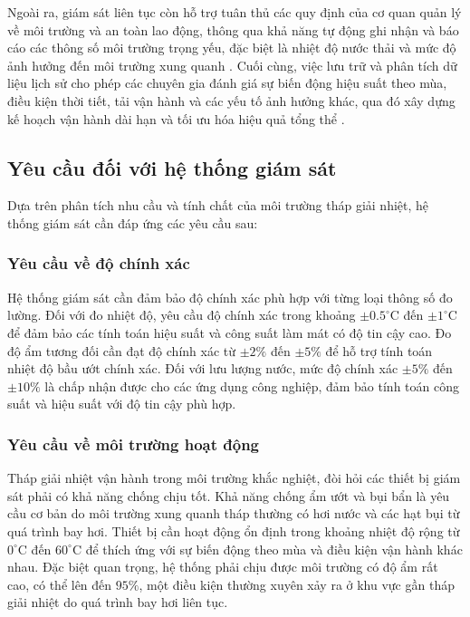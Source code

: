 \documentclass[../main.tex]{subfiles}
\begin{document}
Ngoài ra, giám sát liên tục còn hỗ trợ tuân thủ các quy định của cơ quan quản lý về môi trường và an toàn lao động, thông qua khả năng tự động ghi nhận và báo cáo các thông số môi trường trọng yếu, đặc biệt là nhiệt độ nước thải và mức độ ảnh hưởng đến môi trường xung quanh \cite{epa_cooling_tower_guide_2017}. Cuối cùng, việc lưu trữ và phân tích dữ liệu lịch sử cho phép các chuyên gia đánh giá sự biến động hiệu suất theo mùa, điều kiện thời tiết, tải vận hành và các yếu tố ảnh hưởng khác, qua đó xây dựng kế hoạch vận hành dài hạn và tối ưu hóa hiệu quả tổng thể \cite{li2023ai,pham2023adaptive}.

\subsection{Yêu cầu đối với hệ thống giám sát}
\label{sec:monitoring_system_requirements}

Dựa trên phân tích nhu cầu và tính chất của môi trường tháp giải nhiệt, hệ thống giám sát cần đáp ứng các yêu cầu sau:

\subsubsection{Yêu cầu về độ chính xác}
Hệ thống giám sát cần đảm bảo độ chính xác phù hợp với từng loại thông số đo lường. Đối với đo nhiệt độ, yêu cầu độ chính xác trong khoảng $\pm 0.5^\circ\mathrm{C}$ đến $\pm 1^\circ\mathrm{C}$ để đảm bảo các tính toán hiệu suất và công suất làm mát có độ tin cậy cao. Đo độ ẩm tương đối cần đạt độ chính xác từ $\pm 2\%$ đến $\pm 5\%$ để hỗ trợ tính toán nhiệt độ bầu ướt chính xác. Đối với lưu lượng nước, mức độ chính xác $\pm 5\%$ đến $\pm 10\%$ là chấp nhận được cho các ứng dụng công nghiệp, đảm bảo tính toán công suất và hiệu suất với độ tin cậy phù hợp.

\subsubsection{Yêu cầu về môi trường hoạt động}
Tháp giải nhiệt vận hành trong môi trường khắc nghiệt, đòi hỏi các thiết bị giám sát phải có khả năng chống chịu tốt. Khả năng chống ẩm ướt và bụi bẩn là yêu cầu cơ bản do môi trường xung quanh tháp thường có hơi nước và các hạt bụi từ quá trình bay hơi. Thiết bị cần hoạt động ổn định trong khoảng nhiệt độ rộng từ $0^\circ\mathrm{C}$ đến $60^\circ\mathrm{C}$ để thích ứng với sự biến động theo mùa và điều kiện vận hành khác nhau. Đặc biệt quan trọng, hệ thống phải chịu được môi trường có độ ẩm rất cao, có thể lên đến $95\%$, một điều kiện thường xuyên xảy ra ở khu vực gần tháp giải nhiệt do quá trình bay hơi liên tục.
\end{document}
